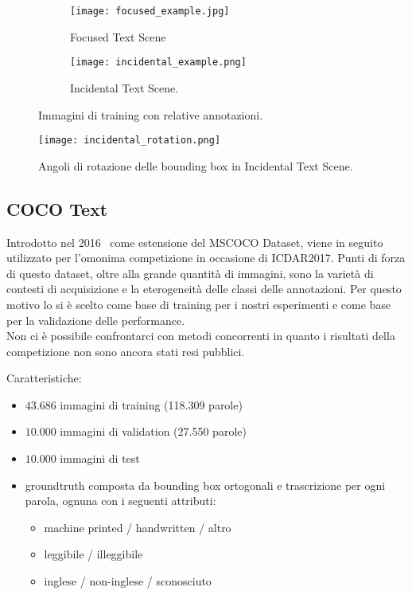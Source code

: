 \begin{figure}[H]
	\centering
	\begin{subfigure}[b]{0.4\textwidth}
		\texttt{[image: focused\_example.jpg]}
		\caption{Focused Text Scene}
	\end{subfigure}
	\hfill
	\begin{subfigure}[b]{0.55\textwidth}
		\texttt{[image: incidental\_example.png]}
		\caption{Incidental Text Scene.}
	\end{subfigure}
	\caption{Immagini di training con relative annotazioni.}
	\texttt{[image: incidental\_rotation.png]}
	\caption{Angoli di rotazione delle bounding box in Incidental Text Scene.}
\end{figure}

\subsection{COCO Text}
\label{subsec:coco}
Introdotto nel 2016~\cite{cocotext} come estensione del MSCOCO Dataset, viene in seguito utilizzato per l'omonima competizione in occasione di ICDAR2017.
Punti di forza di questo dataset, oltre alla grande quantità di immagini, sono la varietà di contesti di acquisizione e la eterogeneità delle classi delle annotazioni. Per questo motivo lo si è scelto come base di training per i nostri esperimenti e come base per la validazione delle performance.\\
Non ci è possibile confrontarci con metodi concorrenti in quanto i risultati della competizione non sono ancora stati resi pubblici.\par
Caratteristiche:
\begin{itemize}
	\item
		$43.686$ immagini di training (118.309 parole)
	\item
		$10.000$ immagini di validation (27.550 parole)
	\item
		$10.000$ immagini di test
	\item
		groundtruth composta da bounding box ortogonali e trascrizione per ogni parola, ognuna con i seguenti attributi:
		\begin{itemize}
			\item
				machine printed / handwritten / altro
			\item
				leggibile / illeggibile
			\item
				inglese / non-inglese / sconosciuto
		\end{itemize}
\end{itemize}

